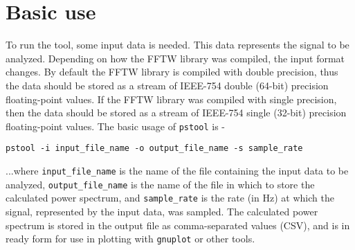 \documentclass[12pt]{article}
\begin{document}
\section{Basic use}
To run the tool, some input data is needed. This data represents the
signal to be analyzed. Depending on how the FFTW library was compiled,
the input format changes. By default the FFTW library is compiled with
double precision, thus the data should be stored as a stream of
IEEE-754 double (64-bit) precision floating-point values. If the FFTW
library was compiled with single precision, then the data should be
stored as a stream of IEEE-754 single (32-bit) precision
floating-point values. The basic usage of \texttt{pstool} is - 
\\
\begin{center}
\texttt{pstool -i input\_file\_name -o output\_file\_name -s sample\_rate}
\end{center}
...where \texttt{input\_file\_name} is the name of the file containing
  the input data to be analyzed, \texttt{output\_file\_name} is the
  name of the file in which to store the calculated power spectrum,
  and \texttt{sample\_rate} is the rate (in Hz) at which the signal,
  represented by the input data, was sampled. The calculated power spectrum is
  stored in the output file as comma-separated values (CSV), and is in
  ready form for use in plotting with \texttt{gnuplot} or other tools.
\end{document}
